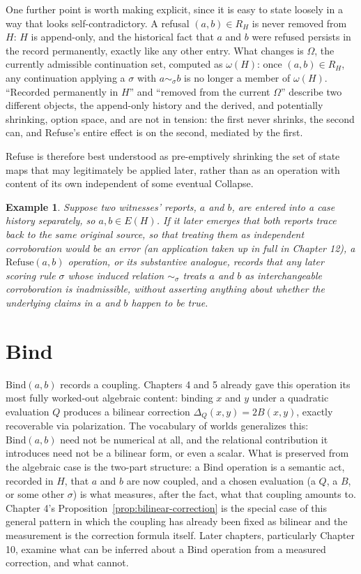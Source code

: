 \documentclass[11pt]{book}
\newtheorem{example}[theorem]{Example}
\begin{document}
One further point is worth making explicit, since it is easy to state loosely in a way that looks self-contradictory. A refusal $(a,b)\in R_H$ is never removed from $H$: $H$ is append-only, and the historical fact that $a$ and $b$ were refused persists in the record permanently, exactly like any other entry. What changes is $\Omega$, the currently admissible continuation set, computed as $\omega(H)$: once $(a,b)\in R_H$, any continuation applying a $\sigma$ with $a\sim_\sigma b$ is no longer a member of $\omega(H)$. ``Recorded permanently in $H$'' and ``removed from the current $\Omega$'' describe two different objects, the append-only history and the derived, and potentially shrinking, option space, and are not in tension: the first never shrinks, the second can, and Refuse's entire effect is on the second, mediated by the first.

Refuse is therefore best understood as pre-emptively shrinking the set of state maps that may legitimately be applied later, rather than as an operation with content of its own independent of some eventual Collapse.

\begin{example}
Suppose two witnesses' reports, $a$ and $b$, are entered into a case history separately, so $a,b\in E(H)$. If it later emerges that both reports trace back to the same original source, so that treating them as independent corroboration would be an error (an application taken up in full in Chapter 12), a $\mathrm{Refuse}(a,b)$ operation, or its substantive analogue, records that any later scoring rule $\sigma$ whose induced relation $\sim_\sigma$ treats $a$ and $b$ as interchangeable corroboration is inadmissible, without asserting anything about whether the underlying claims in $a$ and $b$ happen to be true.
\end{example}

\section{Bind}

$\mathrm{Bind}(a,b)$ records a coupling. Chapters 4 and 5 already gave this operation its most fully worked-out algebraic content: binding $x$ and $y$ under a quadratic evaluation $Q$ produces a bilinear correction $\Delta_Q(x,y)=2B(x,y)$, exactly recoverable via polarization. The vocabulary of worlds generalizes this: $\mathrm{Bind}(a,b)$ need not be numerical at all, and the relational contribution it introduces need not be a bilinear form, or even a scalar. What is preserved from the algebraic case is the two-part structure: a Bind operation is a semantic act, recorded in $H$, that $a$ and $b$ are now coupled, and a chosen evaluation (a $Q$, a $B$, or some other $\sigma$) is what measures, after the fact, what that coupling amounts to. Chapter 4's Proposition~\ref{prop:bilinear-correction} is the special case of this general pattern in which the coupling has already been fixed as bilinear and the measurement is the correction formula itself. Later chapters, particularly Chapter 10, examine what can be inferred about a Bind operation from a measured correction, and what cannot.
\end{document}

